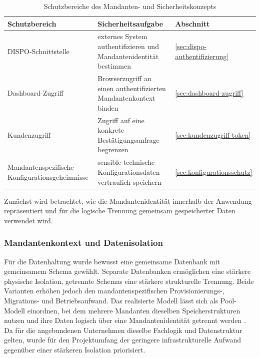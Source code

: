 \documentclass[
  12pt,
  a4paper,
  oneside
]{article}
\begin{document}
\begin{table}[htbp]
  \centering
  \caption{Schutzbereiche des Mandanten- und Sicherheitskonzepts}
  \label{tab:schutzbereiche}
  \small
  \begin{tabularx}{\textwidth}{
      @{}
      >{\raggedright\arraybackslash}p{}
      >{\raggedright\arraybackslash}X
      >{\centering\arraybackslash}p{}
      @{}
    }
    \toprule
    Schutzbereich
      & Sicherheitsaufgabe
      & Abschnitt \\
    \midrule
    DISPO-Schnittstelle
      & externes System authentifizieren und Mandantenidentität bestimmen
      & \ref{sec:dispo-authentifizierung} \\
    Dashboard-Zugriff
      & Browserzugriff an einen authentifizierten Mandantenkontext binden
      & \ref{sec:dashboard-zugriff} \\
    Kundenzugriff
      & Zugriff auf eine konkrete Bestätigungsanfrage begrenzen
      & \ref{sec:kundenzugriff-token} \\
    Mandantenspezifische Konfigurationsgeheimnisse
      & sensible technische Konfigurationsdaten vertraulich speichern
      & \ref{sec:konfigurationsschutz} \\
    \bottomrule
  \end{tabularx}
\end{table}

Zunächst wird betrachtet, wie die Mandantenidentität innerhalb der Anwendung
repräsentiert und für die logische Trennung gemeinsam gespeicherter Daten
verwendet wird.

\subsubsection{Mandantenkontext und Datenisolation}
\label{sec:mandantenkontext}

Für die Datenhaltung wurde bewusst eine gemeinsame Datenbank mit gemeinsamem
Schema gewählt. Separate Datenbanken ermöglichen eine stärkere physische
Isolation, getrennte Schemas eine stärkere strukturelle Trennung. Beide
Varianten erhöhen jedoch den mandantenspezifischen Provisionierungs-,
Migrations- und Betriebsaufwand. Das realisierte Modell lässt sich als
Pool-Modell einordnen, bei dem mehrere Mandanten dieselben Speicherstrukturen
nutzen und ihre Daten logisch über eine Mandantenidentität getrennt werden
\parencite{aws2021partitioningModels}. Da für die
angebundenen Unternehmen dieselbe Fachlogik und Datenstruktur gelten, wurde für
den Projektumfang der geringere infrastrukturelle Aufwand gegenüber einer
stärkeren Isolation priorisiert.
\end{document}

